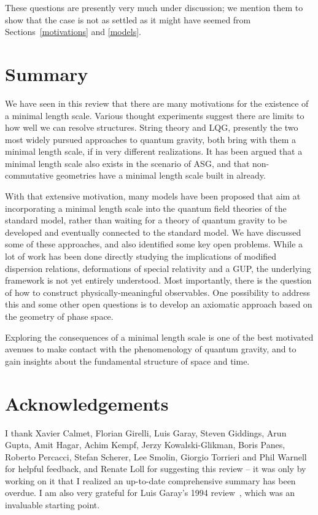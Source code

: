 \documentclass{article}
\begin{document}
These questions are presently very much under
discussion; we mention them to show that the case is not as settled as it might have
seemed from Sections~\ref{motivations} and \ref{models}.


\newpage

\section{Summary}

We have seen in this review that there are many motivations for the existence of a minimal
length scale. Various thought experiments suggest there are limits to how well we can
resolve structures. String theory and LQG, presently the two most widely pursued
approaches to quantum gravity, both bring with them a minimal length scale, if in very
different realizations. It has been argued that a minimal length scale also exists in
the scenario of ASG, and that non-commutative geometries have a
minimal length scale built in already. 

With that extensive motivation, many models have been proposed that aim at incorporating
a minimal length scale into the quantum field theories of the standard
model, rather than waiting for a theory of quantum gravity to be developed and eventually
connected to the standard model. We have discussed some of these approaches, and
also identified some key open problems. While a lot of work has been done directly studying the implications of modified dispersion relations, deformations of special relativity and a GUP, the underlying framework is not
yet entirely understood. Most importantly, there is the question of how to construct
physically-meaningful observables. One possibility to address this and some
other open questions is to develop an axiomatic approach based on the
geometry of phase space. 

Exploring the consequences of 
a minimal length scale is one of the best motivated avenues to make contact with
the phenomenology of quantum gravity, and to gain insights about the fundamental
structure of space and time. 


\newpage

\section{Acknowledgements}

I thank Xavier Calmet, Florian Girelli, Luis Garay, Steven Giddings, Arun Gupta, Amit Hagar, Achim Kempf, Jerzy Kowalski-Glikman, Boris Panes, Roberto Percacci, Stefan Scherer, Lee Smolin, 
Giorgio Torrieri and Phil Warnell for helpful feedback, and Renate Loll for suggesting this review -- it was
only by working on it that I realized an up-to-date comprehensive summary has been overdue.  I am also very grateful for Luis Garay's 1994
review~\cite{Garay:1994en}, which was an invaluable starting point. 
\end{document}
